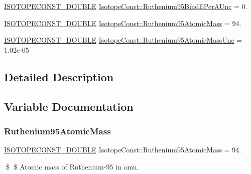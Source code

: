 \begin{DoxyCompactItemize}
\mbox{\hyperlink{group___isotope_const-_macros_ga8f45a7272ce02c0b4c65c44636ed719a}{I\+S\+O\+T\+O\+P\+E\+C\+O\+N\+S\+T\+\_\+\+D\+O\+U\+B\+LE}} \mbox{\hyperlink{group___isotope_const-_ruthenium-_ru95_gaea03db8d548541315dcee765b77226f2}{Isotope\+Const\+::\+Ruthenium95\+Bind\+E\+Per\+A\+Unc}} = 0.
\item 
\mbox{\hyperlink{group___isotope_const-_macros_ga8f45a7272ce02c0b4c65c44636ed719a}{I\+S\+O\+T\+O\+P\+E\+C\+O\+N\+S\+T\+\_\+\+D\+O\+U\+B\+LE}} \mbox{\hyperlink{group___isotope_const-_ruthenium-_ru95_gadc40867e67881c4519c0aeaf62064f75}{Isotope\+Const\+::\+Ruthenium95\+Atomic\+Mass}} = 94.
\item 
\mbox{\hyperlink{group___isotope_const-_macros_ga8f45a7272ce02c0b4c65c44636ed719a}{I\+S\+O\+T\+O\+P\+E\+C\+O\+N\+S\+T\+\_\+\+D\+O\+U\+B\+LE}} \mbox{\hyperlink{group___isotope_const-_ruthenium-_ru95_ga1515661402ab342b9294bc31c8867570}{Isotope\+Const\+::\+Ruthenium95\+Atomic\+Mass\+Unc}} = 1.\+02e-\/05
\end{DoxyCompactItemize}


\subsection{Detailed Description}


\subsection{Variable Documentation}
\mbox{\label{group___isotope_const-_ruthenium-_ru95_gadc40867e67881c4519c0aeaf62064f75}} 
\subsubsection{\texorpdfstring{Ruthenium95\+Atomic\+Mass}{Ruthenium95AtomicMass}}
{\footnotesize\ttfamily \mbox{\hyperlink{group___isotope_const-_macros_ga8f45a7272ce02c0b4c65c44636ed719a}{I\+S\+O\+T\+O\+P\+E\+C\+O\+N\+S\+T\+\_\+\+D\+O\+U\+B\+LE}} Isotope\+Const\+::\+Ruthenium95\+Atomic\+Mass = 94.}

\$ \$ Atomic mass of Ruthenium-\/95 in amu. \mbox{\label{group___isotope_const-_ruthenium-_ru95_ga1515661402ab342b9294bc31c8867570}} 
